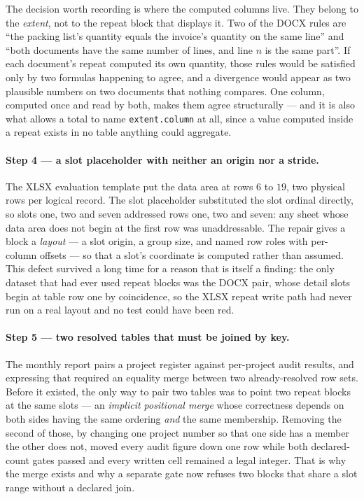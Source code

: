 The decision worth recording is where the computed columns live. They belong to the
\emph{extent}, not to the repeat block that displays it. Two of the DOCX rules are ``the
packing list's quantity equals the invoice's quantity on the same line'' and ``both documents
have the same number of lines, and line $n$ is the same part''. If each document's repeat
computed its own quantity, those rules would be satisfied only by two formulas happening to
agree, and a divergence would appear as two plausible numbers on two documents that nothing
compares. One column, computed once and read by both, makes them agree structurally --- and
it is also what allows a total to name \texttt{extent.column} at all, since a value computed
inside a repeat exists in no table anything could aggregate.

\paragraph{Step 4 --- a slot placeholder with neither an origin nor a stride.}
The XLSX evaluation template put the data area at rows $6$ to $19$, two physical rows per
logical record. The slot placeholder substituted the slot ordinal directly, so slots one, two
and seven addressed rows one, two and seven: any sheet whose data area does not begin at the
first row was unaddressable. The repair gives a block a \emph{layout} --- a slot origin, a
group size, and named row roles with per-column offsets --- so that a slot's coordinate is
computed rather than assumed. This defect survived a long time for a reason that is itself a
finding: the only dataset that had ever used repeat blocks was the DOCX pair, whose detail
slots begin at table row one by coincidence, so the XLSX repeat write path had never run on a
real layout and no test could have been red.

\paragraph{Step 5 --- two resolved tables that must be joined by key.}
The monthly report pairs a project register against per-project audit results, and expressing
that required an equality merge between two already-resolved row sets. Before it existed, the
only way to pair two tables was to point two repeat blocks at the same slots --- an
\emph{implicit positional merge} whose correctness depends on both sides having the same
ordering \emph{and} the same membership. Removing the second of those, by changing one
project number so that one side has a member the other does not, moved every audit figure down
one row while both declared-count gates passed and every written cell remained a legal
integer. That is why the merge exists and why a separate gate now refuses two blocks that
share a slot range without a declared join.

